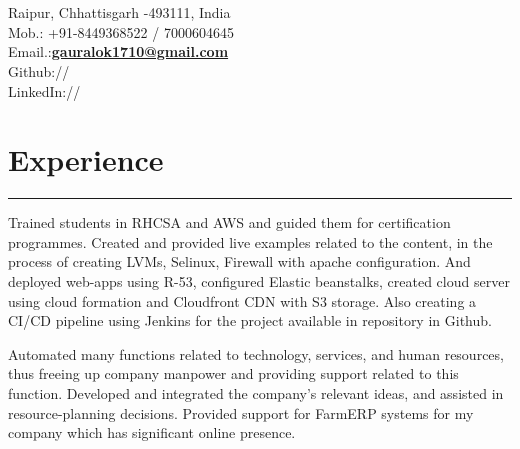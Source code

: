 \documentclass[]{rahulworld-resume}
\begin{document}
\hfill
\begin{minipage}[t]{0.62\textwidth} 
\hspace*{0pt}\hfill    \\
\hspace*{0pt}\hfill    \\
\hspace*{0pt}\hfill Raipur, Chhattisgarh -493111, India \\
\hspace*{0pt}\hfill Mob.: +91-8449368522 / 7000604645\\
\hspace*{0pt}\hfill Email.:\textbf{\href{mailto:gauralok1710@gmail.com}{gauralok1710@gmail.com}} \\
\hspace*{0pt}\hfill Github:// \href{https://github.com/gauralok1710}{} \\
\hspace*{0pt}\hfill LinkedIn://  \href{https://www.linkedin.com/in/gauralok1710}{} \\
\section{Experience}
\noindent\rule{12.5cm}{0.4pt}
 
\noindent
\hspace{2em}%
\begin{minipage}{0.95\textwidth\vspace{4pt}}
Trained students in RHCSA and AWS and guided them for certification programmes.
Created and provided live examples related to the content, in the process of  creating LVMs, Selinux, Firewall with apache configuration. And deployed web-apps using R-53, configured Elastic beanstalks, created cloud server using cloud formation and Cloudfront CDN with S3 storage. Also creating a CI/CD pipeline using Jenkins for the project available in repository in Github.
\end{minipage}
\sectionsep

 
\noindent
\hspace{2em}%
\begin{minipage}{0.95\textwidth\vspace{2pt}}
Automated many functions related to technology, services, and human resources, thus freeing up company manpower and providing support related to this function.
Developed and integrated the company's relevant ideas, and assisted in resource-planning decisions.
Provided support for FarmERP systems for my company which has significant online presence.
\end{minipage}
\sectionsep

\end{minipage}
\end{document}
